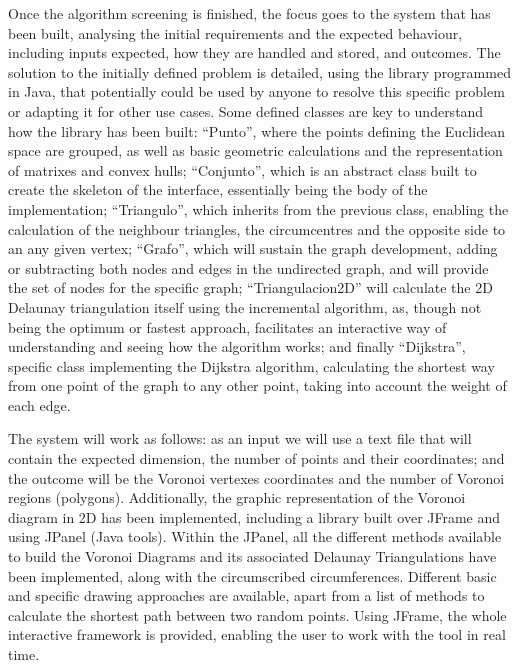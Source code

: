 Once the algorithm screening is finished, the focus goes to the system that has been built, analysing the initial requirements and the expected behaviour, including inputs expected, how they are handled and stored, and outcomes. The solution to the initially defined problem is detailed, using the library programmed in Java, that potentially could be used by anyone to resolve this specific problem or adapting it for other use cases. Some defined classes are key to understand how the library has been built: “Punto”, where the points defining the Euclidean space are grouped, as well as basic geometric calculations and the representation of matrixes and convex hulls; “Conjunto”, which is an abstract class built to create the skeleton of the interface, essentially being the body of the implementation; “Triangulo”, which inherits from the previous class, enabling the calculation of the neighbour triangles, the circumcentres and the opposite side to an any given vertex; “Grafo”, which will sustain the graph development, adding or subtracting both nodes and edges in the undirected graph, and will provide the set of nodes for the specific graph; “Triangulacion2D” will calculate the 2D Delaunay triangulation itself using the incremental algorithm, as, though not being the optimum or fastest approach, facilitates an interactive way of understanding and seeing how the algorithm works; and finally “Dijkstra”, specific class implementing the Dijkstra algorithm, calculating the shortest way from one point of the graph to any other point, taking into account the weight of each edge.

The system will work as follows: as an input we will use a text file that will contain the expected dimension, the number of points and their coordinates; and the outcome will be the Voronoi vertexes coordinates and the number of Voronoi regions (polygons). Additionally, the graphic representation of the Voronoi diagram in 2D has been implemented, including a library built over JFrame and using JPanel (Java tools). Within the JPanel, all the different methods available to build the Voronoi Diagrams and its associated Delaunay Triangulations have been implemented, along with the circumscribed circumferences. Different basic and specific drawing approaches are available, apart from a list of methods to calculate the shortest path between two random points. Using JFrame, the whole interactive framework is provided, enabling the user to work with the tool in real time.

